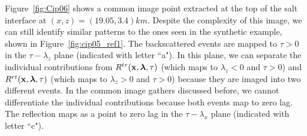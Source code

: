 Figure~\ref{fig:Cip06} shows a common image point extracted at the top of the salt interface at $(x,z)=(19.05,3.4)km$. Despite the complexity of this image, we can still
identify similar patterns to the ones seen in the synthetic example, shown in Figure~\ref{fig:cip05_ref1}. The backscattered events are mapped to $\tau>0$ in the
$\tau-\lambda_z$ plane (indicated with letter ``a"). In this plane, we can separate the individual contributions 
from $R^{tr}({\bf x},{\boldsymbol{\lambda}},\tau)$ (which maps to $\lambda_z<0$ and $\tau>0$) and $R^{rt}({\bf x},{\boldsymbol{\lambda}},\tau)$ (which maps to $\lambda_z>0$ and $\tau>0$) because they are imaged into two different events.
In the common image gathers discussed before, we cannot differentiate the individual
contributions because both events map to zero lag. The reflection maps as a point to zero lag in the $\tau-\lambda_x$ plane (indicated with letter ``c"). 

